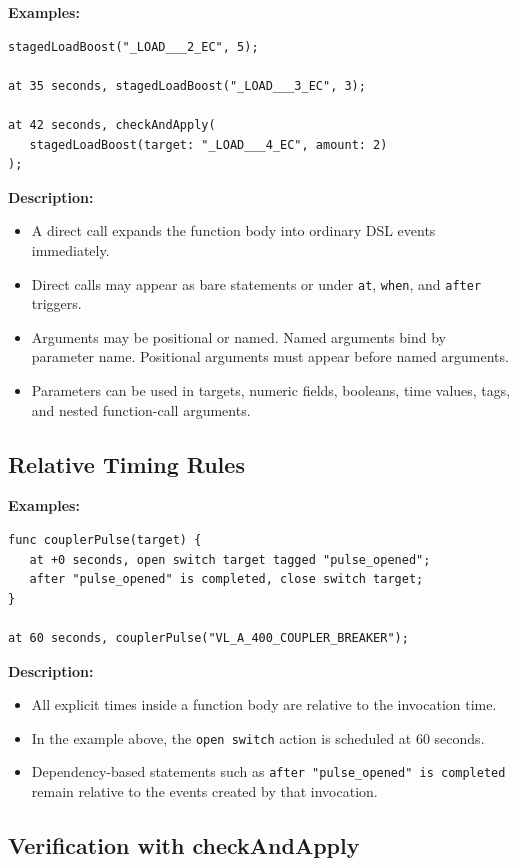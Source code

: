 \documentclass[12pt]{article}
\begin{document}
\textbf{Examples:}
\begin{lstlisting}
stagedLoadBoost("_LOAD___2_EC", 5);

at 35 seconds, stagedLoadBoost("_LOAD___3_EC", 3);

at 42 seconds, checkAndApply(
   stagedLoadBoost(target: "_LOAD___4_EC", amount: 2)
);
\end{lstlisting}

\textbf{Description:}
\begin{itemize}
  \item A direct call expands the function body into ordinary DSL events immediately.
  \item Direct calls may appear as bare statements or under \texttt{at}, \texttt{when}, and \texttt{after}
        triggers.
  \item Arguments may be positional or named. Named arguments bind by parameter name. Positional arguments must
        appear before named arguments.
  \item Parameters can be used in targets, numeric fields, booleans, time values, tags, and nested function-call
        arguments.
\end{itemize}

\subsection{Relative Timing Rules}

\textbf{Examples:}
\begin{lstlisting}
func couplerPulse(target) {
   at +0 seconds, open switch target tagged "pulse_opened";
   after "pulse_opened" is completed, close switch target;
}

at 60 seconds, couplerPulse("VL_A_400_COUPLER_BREAKER");
\end{lstlisting}

\textbf{Description:}
\begin{itemize}
  \item All explicit times inside a function body are relative to the invocation time.
  \item In the example above, the \texttt{open switch} action is scheduled at 60 seconds.
  \item Dependency-based statements such as \texttt{after "pulse\_opened" is completed} remain relative to the
        events created by that invocation.
\end{itemize}

\subsection{Verification with checkAndApply}
\end{document}
